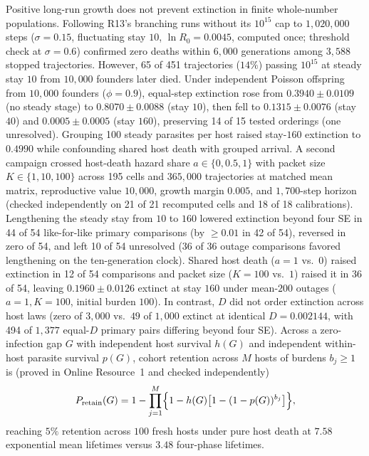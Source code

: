 Positive long-run growth does not prevent extinction in finite whole-number populations. Following R13's branching runs without its $10^{15}$ cap to $1{,}020{,}000$ steps ($\sigma = 0.15$, fluctuating stay $10$, $\ln R_0 = 0.0045$, computed once; threshold check at $\sigma = 0.6$) confirmed zero deaths within $6{,}000$ generations among $3{,}588$ stopped trajectories. However, 65 of 451 trajectories ($14\%$) passing $10^{15}$ at steady stay $10$ from $10{,}000$ founders later died. Under independent Poisson offspring from $10{,}000$ founders ($\phi = 0.9$), equal-step extinction rose from $0.3940 \pm 0.0109$ (no steady stage) to $0.8070 \pm 0.0088$ (stay $10$), then fell to $0.1315 \pm 0.0076$ (stay $40$) and $0.0005 \pm 0.0005$ (stay $160$), preserving 14 of 15 tested orderings (one unresolved). Grouping 100 steady parasites per host raised stay-$160$ extinction to $0.4990$ while confounding shared host death with grouped arrival. A second campaign crossed host-death hazard share $a \in \{0, 0.5, 1\}$ with packet size $K \in \{1, 10, 100\}$ across 195 cells and $365{,}000$ trajectories at matched mean matrix, reproductive value $10{,}000$, growth margin $0.005$, and $1{,}700$-step horizon (checked independently on 21 of 21 recomputed cells and 18 of 18 calibrations). Lengthening the steady stay from $10$ to $160$ lowered extinction beyond four SE in 44 of 54 like-for-like primary comparisons (by $\ge 0.01$ in 42 of 54), reversed in zero of 54, and left 10 of 54 unresolved (36 of 36 outage comparisons favored lengthening on the ten-generation clock). Shared host death ($a = 1$ vs.\ $0$) raised extinction in 12 of 54 comparisons and packet size ($K = 100$ vs.\ $1$) raised it in 36 of 54, leaving $0.1960 \pm 0.0126$ extinct at stay $160$ under mean-$200$ outages ($a = 1, K = 100$, initial burden $100$). In contrast, $D$ did not order extinction across host laws (zero of $3{,}000$ vs.\ $49$ of $1{,}000$ extinct at identical $D = 0.002144$, with 494 of $1{,}377$ equal-$D$ primary pairs differing beyond four SE). Across a zero-infection gap $G$ with independent host survival $h(G)$ and independent within-host parasite survival $p(G)$, cohort retention across $M$ hosts of burdens $b_j \ge 1$ is (proved in Online Resource~1 and checked independently)
\begin{equation}\label{num-eq-gap}
P_{\mathrm{retain}}(G) = 1 - \prod_{j=1}^{M}\Bigl\{1 - h(G)\bigl[1 - (1 - p(G))^{b_j}\bigr]\Bigr\},
\end{equation}
reaching $5\%$ retention across $100$ fresh hosts under pure host death at $7.58$ exponential mean lifetimes versus $3.48$ four-phase lifetimes.

